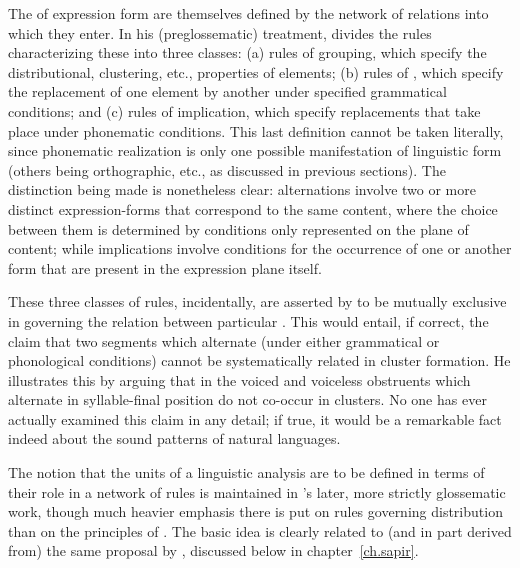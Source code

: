 The  of expression form are themselves defined by the network
of relations into which they enter. In his
\citeyear{hjelmslev.uldall35:phonematics} (preglossematic) treatment,
{\Hjelmslev} divides the {rules} characterizing these into three classes:
(a) {rules} of grouping, which specify the distributional, clustering,
etc., properties of elements; (b) {rules} of , which specify
the replacement of one element by another under specified grammatical
conditions; and (c) {rules} of implication, which specify replacements
that take place under phonematic conditions. This last definition
cannot be taken literally, since phonematic realization is only one
possible manifestation of linguistic form (others being orthographic,
etc., as discussed in previous sections). The distinction being made
is nonetheless clear: alternations involve two or more distinct
expression-forms that correspond to the same content, where the choice
between them is determined by conditions only represented on the plane
of content; while implications involve conditions for the occurrence
of one or another form that are present in the expression plane
itself.

These three classes of {rules}, incidentally, are asserted by {\Hjelmslev}
to be mutually exclusive in governing the relation between particular
. This would entail, if correct, the claim that two
segments which alternate (under either grammatical or phonological
conditions) cannot be systematically related in cluster formation. He
illustrates this by arguing that in  the voiced and voiceless
obstruents which alternate in syllable-final position do not co-occur
in clusters. No one has ever actually examined this claim in any
detail; if true, it would be a remarkable fact indeed about the sound
patterns of natural languages.

The notion that the units of a linguistic analysis are to be defined
in terms of their role in a network of {rules} is maintained in
{\Hjelmslev}'s later, more strictly glossematic work, though much heavier
emphasis there is put on {rules} governing distribution than on the
principles of . The basic idea is clearly related to (and
in part derived from) the same proposal by {\Sapir}, discussed below in
chapter~\ref{ch.sapir}.

